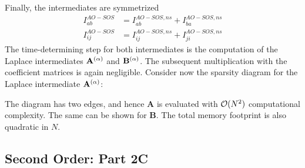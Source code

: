 \noindent Finally, the intermediates are symmetrized
\begin{align}
I^{AO-SOS}_{ab} &= I^{AO-SOS,ns}_{ab} + I^{AO-SOS,ns}_{ba} \\
I^{AO-SOS}_{ij} &= I^{AO-SOS,ns}_{ij} + I^{AO-SOS,ns}_{ji}
\end{align}
The time-determining step for both intermediates is the computation of the Laplace intermediates $\mathbf{A}^{(\alpha)}$ and $\mathbf{B}^{(\alpha)}$. The subsequent multiplication with the coefficient matrices is again negligible. Consider now the sparsity diagram for the Laplace intermediate $\mathbf{A}^{(\alpha)}$:
\begin{center}
\end{center}

\noindent The diagram has two edges, and hence $\mathbf{A}$ is evaluated with $\mathcal{O}(N^{2})$ computational complexity. The same can be shown for $\mathbf{B}$. The total memory footprint is also quadratic in $N$. 

\subsection{Second Order: Part 2C}

